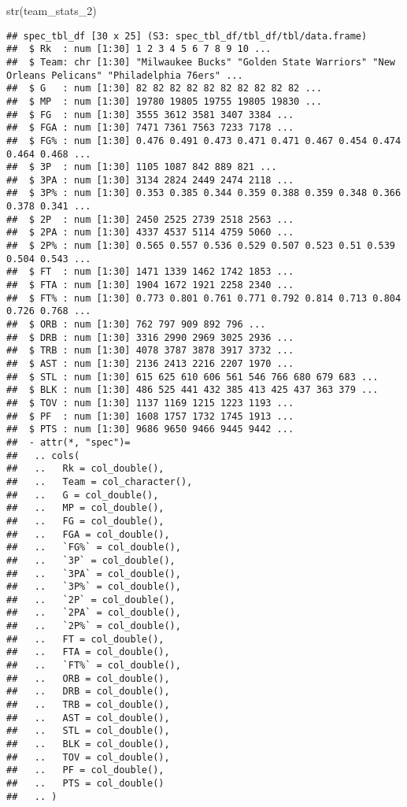 \documentclass[
]{article}
\newenvironment{Shaded}{\begin{snugshade}}{\end{snugshade}}
\newcommand{\FunctionTok}[1]{\textcolor[rgb]{0.00,0.00,0.00}{#1}}
\newcommand{\NormalTok}[1]{#1}
\begin{document}
\begin{Shaded}
\begin{Highlighting}[]
\FunctionTok{str}\NormalTok{(team\_stats\_2)}
\end{Highlighting}
\end{Shaded}

\begin{verbatim}
## spec_tbl_df [30 x 25] (S3: spec_tbl_df/tbl_df/tbl/data.frame)
##  $ Rk  : num [1:30] 1 2 3 4 5 6 7 8 9 10 ...
##  $ Team: chr [1:30] "Milwaukee Bucks" "Golden State Warriors" "New Orleans Pelicans" "Philadelphia 76ers" ...
##  $ G   : num [1:30] 82 82 82 82 82 82 82 82 82 82 ...
##  $ MP  : num [1:30] 19780 19805 19755 19805 19830 ...
##  $ FG  : num [1:30] 3555 3612 3581 3407 3384 ...
##  $ FGA : num [1:30] 7471 7361 7563 7233 7178 ...
##  $ FG% : num [1:30] 0.476 0.491 0.473 0.471 0.471 0.467 0.454 0.474 0.464 0.468 ...
##  $ 3P  : num [1:30] 1105 1087 842 889 821 ...
##  $ 3PA : num [1:30] 3134 2824 2449 2474 2118 ...
##  $ 3P% : num [1:30] 0.353 0.385 0.344 0.359 0.388 0.359 0.348 0.366 0.378 0.341 ...
##  $ 2P  : num [1:30] 2450 2525 2739 2518 2563 ...
##  $ 2PA : num [1:30] 4337 4537 5114 4759 5060 ...
##  $ 2P% : num [1:30] 0.565 0.557 0.536 0.529 0.507 0.523 0.51 0.539 0.504 0.543 ...
##  $ FT  : num [1:30] 1471 1339 1462 1742 1853 ...
##  $ FTA : num [1:30] 1904 1672 1921 2258 2340 ...
##  $ FT% : num [1:30] 0.773 0.801 0.761 0.771 0.792 0.814 0.713 0.804 0.726 0.768 ...
##  $ ORB : num [1:30] 762 797 909 892 796 ...
##  $ DRB : num [1:30] 3316 2990 2969 3025 2936 ...
##  $ TRB : num [1:30] 4078 3787 3878 3917 3732 ...
##  $ AST : num [1:30] 2136 2413 2216 2207 1970 ...
##  $ STL : num [1:30] 615 625 610 606 561 546 766 680 679 683 ...
##  $ BLK : num [1:30] 486 525 441 432 385 413 425 437 363 379 ...
##  $ TOV : num [1:30] 1137 1169 1215 1223 1193 ...
##  $ PF  : num [1:30] 1608 1757 1732 1745 1913 ...
##  $ PTS : num [1:30] 9686 9650 9466 9445 9442 ...
##  - attr(*, "spec")=
##   .. cols(
##   ..   Rk = col_double(),
##   ..   Team = col_character(),
##   ..   G = col_double(),
##   ..   MP = col_double(),
##   ..   FG = col_double(),
##   ..   FGA = col_double(),
##   ..   `FG%` = col_double(),
##   ..   `3P` = col_double(),
##   ..   `3PA` = col_double(),
##   ..   `3P%` = col_double(),
##   ..   `2P` = col_double(),
##   ..   `2PA` = col_double(),
##   ..   `2P%` = col_double(),
##   ..   FT = col_double(),
##   ..   FTA = col_double(),
##   ..   `FT%` = col_double(),
##   ..   ORB = col_double(),
##   ..   DRB = col_double(),
##   ..   TRB = col_double(),
##   ..   AST = col_double(),
##   ..   STL = col_double(),
##   ..   BLK = col_double(),
##   ..   TOV = col_double(),
##   ..   PF = col_double(),
##   ..   PTS = col_double()
##   .. )
\end{verbatim}
\end{document}
